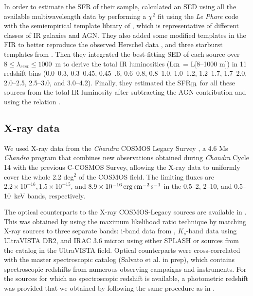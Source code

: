 In order to estimate the SFR of their sample, \citet{2013MNRAS.432...23G} calculated an SED using all the available multiwavelength data by performing a $\chi^2$ fit using the \emph{Le Phare} code \citep{2002MNRAS.329..355A, 2006A&A...457..841I} with the semiempirical template library of \citet{2007ApJ...663...81P}, which is representative of different classes of IR galaxies and AGN. They also added some modified templates in the FIR to better reproduce the observed {Herschel} data \citep[see][]{2010A&A...518L..27G}, and three starburst templates from \citet{2009ApJ...692..556R}.
Then they integrated the best-fitting SED of each source over $8\leq \lambda_{rest}\leq1000$~\textmu m to derive the total IR luminosities (L$_{\rm IR}$ = L[8--1000 \textmu m]) in 11 redshift bins (0.0--0.3, 0.3--0.45, 0.45--.6, 0.6--0.8, 0.8--1.0, 1.0--1.2, 1.2--1.7, 1.7--2.0, 2.0--2.5, 2.5--3.0, and 3.0--4.2). 
Finally, they estimated the SFR$_{\rm IR}$ for all these sources from the total IR luminosity after subtracting the AGN contribution and using the \citet{1998ARA&A..36..189K} relation \citep[see also][for more details]{2015MNRAS.451.3419G}.

\subsection{X-ray data} \label{ssec:Xray}
We used X-ray data from the \textit{Chandra} COSMOS Legacy Survey \citep[COSMOS-Legacy,][]{2016ApJ...819...62C}, a 4.6 Ms \textit{Chandra} program that combines new observations obtained during \textit{Chandra} Cycle 14 with the previous C-COSMOS Survey, allowing the X-ray data to uniformly cover the whole 2.2 deg$^2$ of the COSMOS field. The limiting fluxes are  $2.2 \times 10^{-16}, 1.5 \times 10^{-15}$, and $8.9 \times 10^{-16} \,\mathrm{erg}\,\mathrm{cm}^{-2} \,\mathrm{s}^{-1}$ in the 0.5--2, 2--10, and 0.5--10~keV bands, respectively.

The optical counterparts to the X-ray COSMOS-Legacy sources are available in \citet{2016ApJ...817...34M}. This was obtained by using the maximum likelihood ratio technique \citep[e.g.,][]{1992MNRAS.259..413S, 2005A&A...432...69B, 2012ApJS..201...30C} by matching X-ray sources to three separate bands: i-band data from \citet{2009ApJ...690.1236I}, $K_s$-band data using UltraVISTA DR2, and IRAC 3.6 micron using either SPLASH or \citet{2007ApJS..172...86S}
sources from the \citet{2016ApJS..224...24L} catalog in the UltraVISTA field.
Optical counterparts were cross-correlated with the master spectroscopic catalog (Salvato et al. in prep), which contains spectroscopic redshifts from numerous observing campaigns and instruments. For the sources for which no spectroscopic redshift is available, a photometric redshift was provided that we obtained by following the same procedure as in \citet{2011ApJ...742...61S}. %

